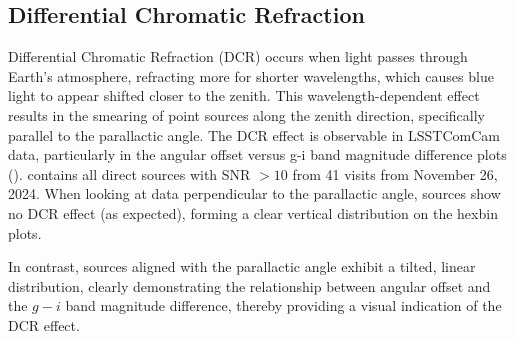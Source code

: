 \subsection{Differential Chromatic Refraction}
\label{sec:differential_chromatic_refraction}
Differential Chromatic Refraction (DCR) occurs when light passes through Earth’s atmosphere, refracting more for shorter wavelengths, which causes blue light to appear shifted closer to the zenith. This wavelength-dependent effect results in the smearing of point sources along the zenith direction, specifically parallel to the parallactic angle. The DCR effect is observable in LSSTComCam data, particularly in the angular offset versus g-i band magnitude difference plots ().  contains all direct sources with \gls{SNR} $>10$ from 41 visits from November 26, 2024. When looking at data perpendicular to the parallactic angle, sources show no DCR effect (as expected), forming a clear vertical distribution on the hexbin plots. 

In contrast, sources aligned with the parallactic angle exhibit a tilted, linear distribution, clearly demonstrating the relationship between angular offset and the $g-i$ band magnitude difference, thereby providing a visual indication of the DCR effect.

